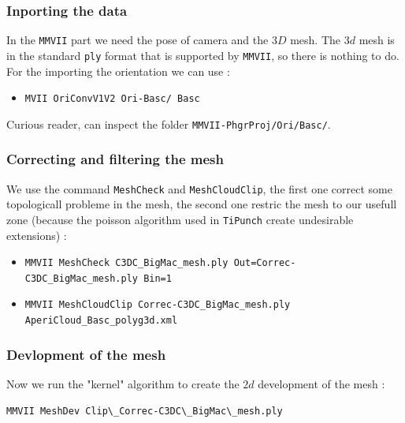\subsubsection{Inporting the data}

In the {\tt MMVII} part we need the pose of camera and the $3D$ mesh. The $3d$ mesh is 
in the standard  {\tt ply} format that is supported by  {\tt MMVII}, so there is nothing
to do. For the importing the orientation  we can use :

\begin{itemize}
	\item {\tt MVII OriConvV1V2 Ori-Basc/ Basc}
\end{itemize}

Curious reader, can inspect the folder {\tt MMVII-PhgrProj/Ori/Basc/}.


\subsubsection{Correcting and filtering the mesh}

We use the command {\tt MeshCheck} and {\tt MeshCloudClip}, the first one
correct some topologicall probleme in the mesh, the second one restric
the mesh to our usefull zone  (because the poisson algorithm used in {\tt TiPunch}
create undesirable extensions) :

\begin{itemize}
	\item {\tt MMVII  MeshCheck C3DC\_BigMac\_mesh.ply Out=Correc-C3DC\_BigMac\_mesh.ply Bin=1}

	\item {\tt MMVII  MeshCloudClip Correc-C3DC\_BigMac\_mesh.ply  AperiCloud\_Basc\_polyg3d.xml}
\end{itemize}


\subsubsection{Devlopment of the mesh}

Now we run the "kernel" algorithm to create the $2d$ development of the mesh :

\begin{lstlisting}
MMVII MeshDev Clip\_Correc-C3DC\_BigMac\_mesh.ply 
\end{lstlisting}

